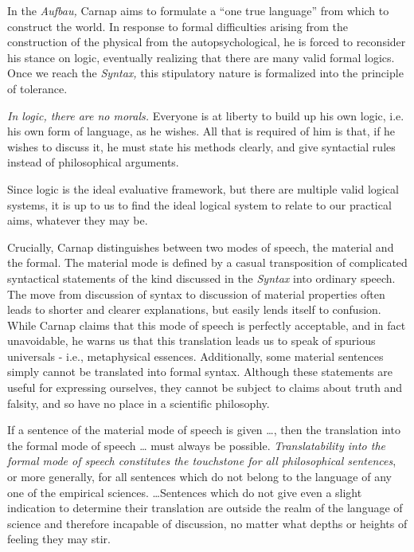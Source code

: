 \documentclass[leqno, 12pt]{turabian-researchpaper}
\begin{document}
	In the \textit{Aufbau,} Carnap aims to formulate a \enquote{one true language}
	from which to construct the world. In response to formal difficulties arising from
	the construction of the physical from the autopsychological, he is forced to
	reconsider his stance on logic, eventually realizing that there are many valid
	formal logics. Once we reach the \textit{Syntax,} this stipulatory nature is formalized
	into the principle of tolerance.
	\begin{displayquote}
		 \emph{In logic, there are no morals.}
		Everyone is at liberty to build up his own logic, i.e. his own form of
		language, as he wishes. All that is required of him is that, if he wishes to
		discuss it, he must state his methods clearly, and give syntactial rules instead
		of philosophical arguments.
	\end{displayquote}
	Since logic is the ideal evaluative framework, but there are multiple valid logical
	systems, it is up to us to find the ideal logical system to relate to our
	practical aims, whatever they may be.

	Crucially, Carnap distinguishes between two modes of speech, the material and the
	formal. The material mode is defined by a casual transposition of complicated
	syntactical statements of the kind discussed in the \textit{Syntax} into ordinary
	speech. The move from discussion of syntax to discussion of material
	properties often leads to shorter and clearer explanations, but easily lends itself
	to confusion. While Carnap claims that this mode of speech is perfectly
	acceptable, and in fact unavoidable, he warns us that this translation leads
	us to speak of spurious universals - i.e., metaphysical essences. Additionally,
	some material sentences simply cannot be translated into formal syntax. Although
	these statements are useful for expressing ourselves, they cannot be subject
	to claims about truth and falsity, and so have no place in a scientific philosophy.

	\begin{displayquote}
		 If a sentence of the material mode of speech
		is given \dots, then the translation into the formal mode of speech \dots
		must always be possible. \emph{Translatability into the formal mode of
		speech constitutes the touchstone for all philosophical sentences}, or more generally,
		for all sentences which do not belong to the language of any one of the
		empirical sciences. \dots Sentences which do not give even a slight indication
		to determine their translation are outside the realm of the language of science
		and therefore incapable of discussion, no matter what depths or heights of
		feeling they may stir.
	\end{displayquote}
\end{document}
